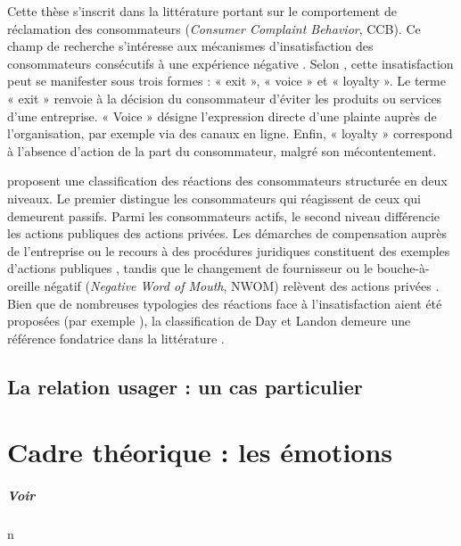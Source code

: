 \documentclass[a4paper,12pt]{report}
\begin{document}
Cette thèse s’inscrit dans la littérature portant sur le comportement de réclamation des consommateurs (\emph{Consumer Complaint Behavior}, CCB). Ce champ de recherche s’intéresse aux mécanismes d’insatisfaction des consommateurs consécutifs à une expérience négative \parencite{richard95}. Selon \textcite{hirschman70}, cette insatisfaction peut se manifester sous trois formes : « exit », « voice » et « loyalty ». Le terme « exit » renvoie à la décision du consommateur d’éviter les produits ou services d’une entreprise. « Voice » désigne l’expression directe d’une plainte auprès de l’organisation, par exemple via des canaux en ligne. Enfin, « loyalty » correspond à l’absence d’action de la part du consommateur, malgré son mécontentement. \par 

\textcite{day77} proposent une classification des réactions des consommateurs structurée en deux niveaux. Le premier distingue les consommateurs qui réagissent de ceux qui demeurent passifs. Parmi les consommateurs actifs, le second niveau différencie les actions publiques des actions privées. Les démarches de compensation auprès de l’entreprise ou le recours à des procédures juridiques constituent des exemples d’actions publiques \parencite*{heung03}, tandis que le changement de fournisseur ou le bouche-à-oreille négatif (\emph{Negative Word of Mouth}, NWOM) relèvent des actions privées \parencite{kitapci09}. Bien que de nombreuses typologies des réactions face à l’insatisfaction aient été proposées (par exemple ), la classification de Day et Landon demeure une référence fondatrice dans la littérature \parencites[]{nimako12}[]{panda14}[]{singh88}. \par




\section{La relation usager : un cas particulier}


\chapter{Cadre théorique : les émotions}

\paragraph{Voir \textcites{hirschman82, holbrook82}} n
\end{document}

